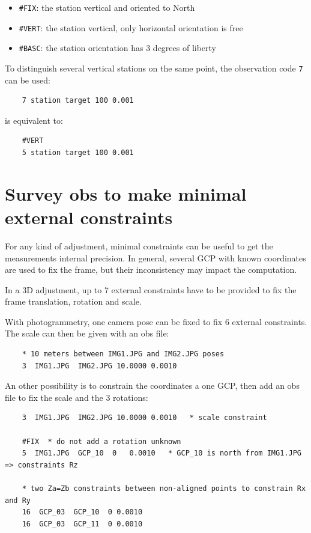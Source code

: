 \begin{itemize}
    \item \texttt{\#FIX}: the station vertical and oriented to North
    \item \texttt{\#VERT}: the station vertical, only horizontal orientation is free
    \item \texttt{\#BASC}: the station orientation has 3 degrees of liberty 
\end{itemize}

To distinguish several vertical stations on the same point, the observation code {\tt 7} can be used:

\begin{verbatim}
    7 station target 100 0.001
\end{verbatim}

is equivalent to:

\begin{verbatim}
    #VERT
    5 station target 100 0.001
\end{verbatim}


\section{Survey obs to make minimal external constraints}

For any kind of adjustment, minimal constraints can be useful to get the measurements internal precision.
In general, several GCP with known coordinates are used to fix the frame, but their inconsistency may
impact the computation.

In a 3D adjustment, up to 7 external constraints have to be provided to fix the frame translation, rotation and scale.

With photogrammetry, one camera pose can be fixed to fix 6 external constraints. The scale can then be given with an obs file:
\begin{verbatim}
    * 10 meters between IMG1.JPG and IMG2.JPG poses
    3  IMG1.JPG  IMG2.JPG 10.0000 0.0010   
\end{verbatim}

An other possibility is to constrain the coordinates a one GCP, then add an obs file to fix the scale and the 3 rotations:
\begin{verbatim}
    3  IMG1.JPG  IMG2.JPG 10.0000 0.0010   * scale constraint

    #FIX  * do not add a rotation unknown
    5  IMG1.JPG  GCP_10  0   0.0010   * GCP_10 is north from IMG1.JPG => constraints Rz

    * two Za=Zb constraints between non-aligned points to constrain Rx and Ry
    16  GCP_03  GCP_10  0 0.0010
    16  GCP_03  GCP_11  0 0.0010
    
\end{verbatim}


